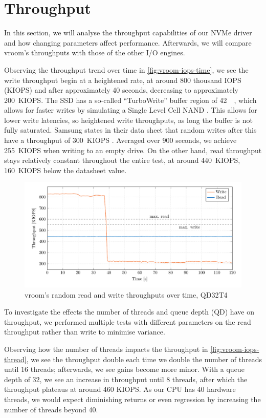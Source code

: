 \section{Throughput}
In this section, we will analyse the throughput capabilities of our NVMe driver and how changing parameters affect performance. Afterwards, we will compare vroom's throughputs with those of the other I/O engines.

Observing the throughput trend over time in \autoref{fig:vroom-iops-time}, we see the write throughput begin at a heightened rate, at around 800 thousand IOPS (KIOPS) and after approximately 40 seconds, decreasing to approximately \qty{200}{KIOPS}. The SSD has a so-called ``TurboWrite'' buffer region of \qty{42}{\giga\byte}, which allows for faster writes by simulating a Single Level Cell NAND \cite{turbowrite}. This allows for lower write latencies, so heightened write throughputs, as long the buffer is not fully saturated. Samsung states in their data sheet that random writes after this have a throughput of \qty{300}{KIOPS} \cite{ssd-datasheet}. Averaged over 900 seconds, we achieve \qty{255}{KIOPS} when writing to an empty drive. On the other hand, read throughput stays relatively constant throughout the entire test, at around \qty{440}{KIOPS}, \qty{160}{KIOPS} below the datasheet value.

\begin{figure}[H]
  \centering
    \includegraphics[width=\textwidth]{figures/vroom-iops-time}
    \caption{vroom's random read and write throughputs over time, QD32T4}
    \label{fig:vroom-iops-time}
\end{figure}

To investigate the effects the number of threads and queue depth (QD) have on throughput, we performed multiple tests with different parameters on the read throughput rather than write to minimise variance.

Observing how the number of threads impacts the throughput in \autoref{fig:vroom-iops-thread}, we see the throughput double each time we double the number of threads until 16 threads; afterwards, we see gains become more minor. With a queue depth of 32, we see an increase in throughput until 8 threads, after which the throughput plateaus at around 460 KIOPS. As our CPU has 40 hardware threads, we would expect diminishing returns or even regression by increasing the number of threads beyond 40.

